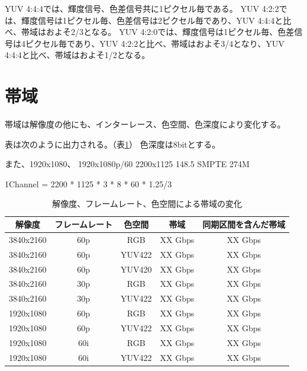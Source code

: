 
YUV 4:4:4では、輝度信号、色差信号共に1ピクセル毎である。
YUV 4:2:2では、輝度信号は1ピクセル毎、色差信号は2ピクセル毎であり、YUV 4:4:4と比べ、帯域はおよそ2/3となる。
YUV 4:2:0では、輝度信号は1ピクセル毎、色差信号は4ピクセル毎であり、YUV 4:2:2と比べ、帯域はおよそ3/4となり、YUV 4:4:4と比べ、帯域はおよそ1/2となる。

\section{帯域}
\label{sec:bandwidth}

帯域は解像度の他にも、インターレース、色空間、色深度により変化する。

表は次のように出力される。（表\ref{tb:video-bandwidth}）
色深度は8bitとする。

また、1920x1080、
1920x1080p/60 2200x1125 148.5 SMPTE 274M

1Channel = 2200 * 1125 * 3 * 8 * 60 * 1.25/3

\begin{table}[htbp]
  \caption{解像度、フレームレート、色空間による帯域の変化}
  \label{tb:video-bandwidth}
  \begin{center}
  \begin{tabular}{c|c|c|c|c}
    \hline
    解像度     & フレームレート & 色空間  & 帯域     & 同期区間を含んだ帯域 \\\hline\hline
    3840x2160 & 60p          & RGB    & XX Gbps & XX Gbps           \\\hline
    3840x2160 & 60p          & YUV422 & XX Gbps & XX Gbps           \\\hline
    3840x2160 & 60p          & YUV420 & XX Gbps & XX Gbps           \\\hline
    3840x2160 & 30p          & RGB    & XX Gbps & XX Gbps           \\\hline
    3840x2160 & 30p          & YUV422 & XX Gbps & XX Gbps           \\\hline
    1920x1080 & 60p          & RGB    & XX Gbps & XX Gbps           \\\hline
    1920x1080 & 60p          & YUV422 & XX Gbps & XX Gbps           \\\hline
    1920x1080 & 60i          & RGB    & XX Gbps & XX Gbps           \\\hline
    1920x1080 & 60i          & YUV422 & XX Gbps & XX Gbps           \\\hline
  \end{tabular}\end{center}
\end{table}

